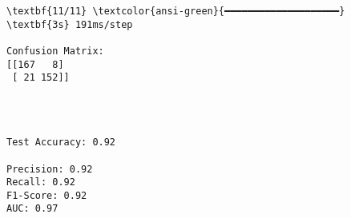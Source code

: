 \documentclass[11pt]{article}
\begin{document}
    \begin{Verbatim}[commandchars=\\\{\}]
\textbf{11/11} \textcolor{ansi-green}{━━━━━━━━━━━━━━━━━━━━} \textbf{3s} 191ms/step

Confusion Matrix:
[[167   8]
 [ 21 152]]
    \end{Verbatim}

    \begin{center}
    \end{center}
    { \hspace*{\fill} \\}
    
    \begin{Verbatim}[commandchars=\\\{\}]

Test Accuracy: 0.92

Precision: 0.92
Recall: 0.92
F1-Score: 0.92
AUC: 0.97
    \end{Verbatim}

    \begin{center}
    \end{center}
    { \hspace*{\fill} \\}
    

    
    
    
\end{document}
